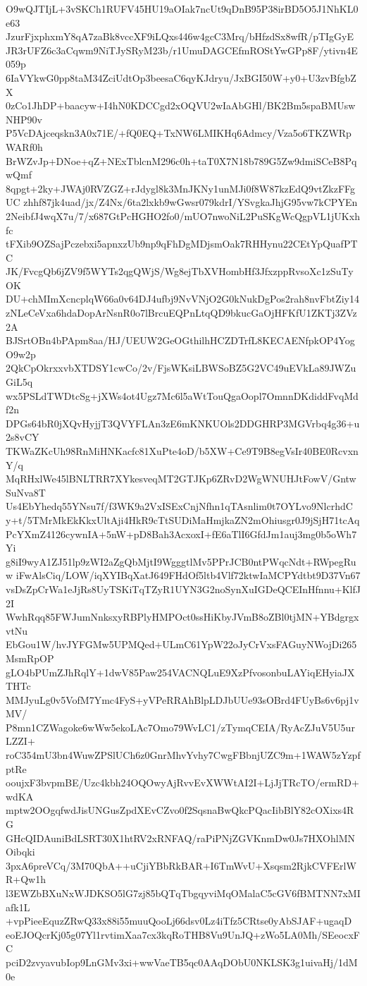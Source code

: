 O9wQJTIjL+3vSKCh1RUFV45HU19aOIak7ncUt9qDnB95P38irBD5O5J1NhKL0e63
JzurFjxphxmY8qA7zaBk8vccXF9iLQxs446w4gcC3Mrq/bHfzdSx8wfR/pTIgGyE
JR3rUFZ6c3aCqwm9NiTJySRyM23b/r1UmuDAGCEfmROStYwGPp8F/ytivn4E059p
6IaVYkwG0pp8taM34ZciUdtOp3beesaC6qyKJdryu/JxBGI50W+y0+U3zvBfgbZX
0zCo1JhDP+baacyw+I4hN0KDCCgd2xOQVU2wIaAbGHl/BK2Bm5spaBMUswNHP90v
P5VcDAjceqskn3A0x71E/+fQ0EQ+TxNW6LMIKHq6Admcy/Vza5o6TKZWRpWARf0h
BrWZvJp+DNoe+qZ+NExTblcnM296c0h+taT0X7N18b789G5Zw9dmiSCeB8PqwQmf
8qpgt+2ky+JWAj0RVZGZ+rJdygl8k3MnJKNy1unMJi0f8W87kzEdQ9vtZkzFFgUC
zhhf87jk4uad/jx/Z4Nx/6ta2lxkb9wGwsr079kdrI/YSvgkaJhjG95vw7kCPYEn
2NeibfJ4wqX7u/7/x687GtPcHGHO2fo0/mUO7nwoNiL2PuSKgWcQgpVL1jUKxhfc
tFXib9OZSajPczebxi5apnxzUb9np9qFhDgMDjsmOak7RHHynu22CEtYpQuafPTC
JK/FvcgQb6jZV9f5WYTs2qgQWjS/Wg8ejTbXVHombHf3JfxzppRvsoXc1zSuTyOK
DU+chMImXcncplqW66a0v64DJ4ufbj9NvVNjO2G0kNukDgPos2rah8nvFbtZiy14
zNLeCeVxa6hdaDopArNsnR0o7lBrcuEQPnLtqQD9bkucGaOjHFKfU1ZKTj3ZVz2A
BJSrtOBn4bPApm8aa/HJ/UEUW2GeOGthilhHCZDTrfL8KECAENfpkOP4YogO9w2p
2QkCpOkrxxvbXTDSY1cwCo/2v/FjsWKsiLBWSoBZ5G2VC49uEVkLa89JWZuGiL5q
wx5PSLdTWDtcSg+jXWs4ot4Ugz7Mc6l5aWtTouQgaOopl7OmnnDKdiddFvqMdf2n
DPGs64bR0jXQvHyjjT3QVYFLAn3zE6mKNKUOls2DDGHRP3MGVrbq4g36+u2s8vCY
TKWaZKcUh98RnMiHNKacfc81XuPte4oD/b5XW+Ce9T9B8egVsIr40BE0RcvxnY/q
MqRHxlWe45lBNLTRR7XYkesveqMT2GTJKp6ZRvD2WgWNUHJtFowV/GntwSuNva8T
Us4EbYhedq55YNsu7f/f3WK9a2VxISExCnjNfhn1qTAsnlim0t7OYLvo9NlcrhdC
y+t/5TMrMkEkKkxUltAji4HkR9cTtSUDiMaHmjkaZN2mOhiusgr0J9jSjH71tcAq
PcYXmZ4126cywnIA+5nW+pD8Bah3AcxoxI+fE6aTlI6GfdJm1auj3mg0b5oWh7Yi
g8iI9wyA1ZJ51lp9zWI2aZgQbMjtI9WgggtlMv5PPrJCB0ntPWqcNdt+RWpegRuw
iFwAlsCiq/LOW/iqXYIBqXatJ649FHdOf5ltb4Vlf72ktwIaMCPYdtbt9D37Vn67
vsDsZpCrWa1eJjRs8UyTSKiTqTZyR1UYN3G2noSynXuIGDeQCEInHfnnu+KlfJ2I
WwhRqq85FWJumNnksxyRBPlyHMPOct0ssHiKbyJVmB8oZBl0tjMN+YBdgrgxvtNu
EbGou1W/hvJYFGMw5UPMQed+ULmC61YpW22oJyCrVxsFAGuyNWojDi265MsmRpOP
gLO4bPUmZJhRqlY+1dwV85Paw254VACNQLuE9XzPfvosonbuLAYiqEHyiaJXTHTc
MMJyuLg0v5VofM7Ymc4FyS+yVPeRRAhBlpLDJbUUe93sOBrd4FUyBs6v6pj1vMV/
P8mn1CZWagoke6wWw5ekoLAc7Omo79WvLC1/zTymqCEIA/RyAcZJuV5U5urLZZI+
roC354mU3bn4WuwZPSlUCh6z0GnrMhvYvhy7CwgFBbnjUZC9m+1WAW5zYzpfptRe
ooujxF3bvpmBE/Uzc4kbh24OQOwyAjRvvEvXWWtAI2I+LjJjTRcTO/ermRD+wdKA
mptw2OOgqfwdJisUNGusZpdXEvCZvo0f2SqsnaBwQkcPQacIibBlY82cOXixs4RG
GHcQIDAuniBdLSRT30X1htRV2xRNFAQ/raPiPNjZGVKnmDw0Js7HXOhlMNOibqki
3pxA6preVCq/3M70QbA++uCjiYBbRkBAR+I6TmWvU+Xsqsm2RjkCVFErlWR+Qw1h
l3EWZbBXuNxWJDKSO5lG7zj85bQTqTbgqyviMqOMalaC5cGV6fBMTNN7xMIafk1L
+vpPieeEquzZRwQ33x88i55muuQooLj66dsv0Lz4iTfz5CRtse0yAbSJAF+ugaqD
eoEJOQcrKj05g07Yl1rvtimXaa7cx3kqRoTHB8Vu9UnJQ+zWo5LA0Mh/SEeocxFC
pciD2zvyavubIop9LnGMv3xi+wwVaeTB5qc0AAqDObU0NKLSK3g1uivaHj/1dM0e
